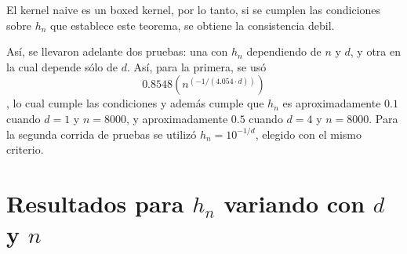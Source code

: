 \documentclass[12pt, a4paper]{article}
\begin{document}
El kernel naive es un boxed kernel, por lo tanto, si se cumplen las condiciones sobre $h_n$ que establece este teorema, se obtiene la consistencia debil.

Así, se llevaron adelante dos pruebas: una con $h_n$ dependiendo de $n$ y $d$, y otra en la cual depende sólo de $d$. Así, para la primera, se usó $$ 0.8548 (n^{(-1/(4.054 \cdot d))}) $$, lo cual cumple las condiciones y además cumple que $h_n$ es aproximadamente $0.1$ cuando $d=1$ y $n=8000$, y aproximadamente $0.5$ cuando $d=4$ y $n=8000$. Para la segunda corrida de pruebas se utilizó $h_n=10^{-1/d}$, elegido con el mismo criterio.

\section{Resultados para $h_n$ variando con $d$ y $n$}
\end{document}
